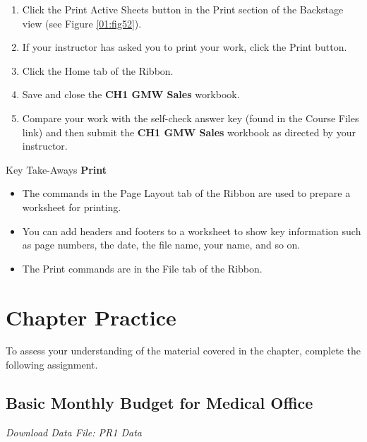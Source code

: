 \begin{enumerate}[resume]
	\item Click the Print Active Sheets button in the Print section of the Backstage view (see Figure \ref{01:fig52}).
	\item If your instructor has asked you to print your work, click the Print button.
	\item Click the Home tab of the Ribbon.
	\item Save and close the \textbf{CH1 GMW Sales} workbook.
	\item Compare your work with the self-check answer key (found in the Course Files link) and then submit the \textbf{CH1 GMW Sales} workbook as directed by your instructor.
\end{enumerate}

\begin{center}
	\begin{tkwbox}{Key Take-Aways}
		\textbf{Print}
		\\
		\begin{itemize}
			\setlength{\itemsep}{0pt}
			\setlength{\parskip}{0pt}
			\setlength{\parsep}{0pt}

			\item The commands in the Page Layout tab of the Ribbon are used to prepare a worksheet for printing.
			\item You can add headers and footers to a worksheet to show key information such as page numbers, the date, the file name, your name, and so on.
			\item The Print commands are in the File tab of the Ribbon.
			
		\end{itemize}
	\end{tkwbox}
\end{center}

\section{Chapter Practice}

To assess your understanding of the material covered in the chapter, complete the following assignment.

\subsection{Basic Monthly Budget for Medical Office}

\textit{Download Data File: PR1 Data}

